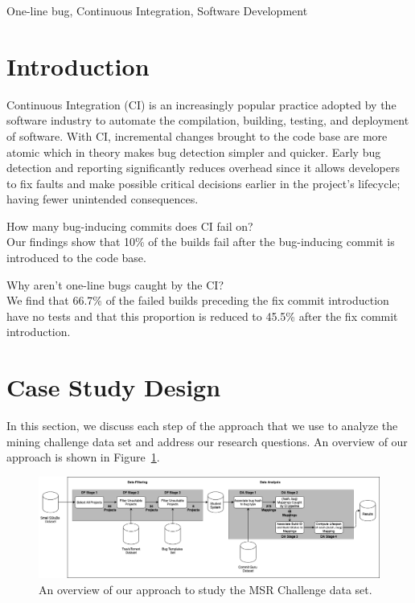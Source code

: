 \documentclass[10pt,conference]{IEEEtran}
\begin{document}
\begin{IEEEkeywords}
	One-line bug, Continuous Integration, Software Development
\end{IEEEkeywords}

\section{Introduction}
Continuous Integration (CI) is an increasingly popular practice adopted by the software industry to automate the compilation, building, testing, and deployment of software. With CI, incremental changes brought to the code base are more atomic which in theory makes bug detection simpler and quicker. Early bug detection and reporting significantly reduces overhead since it allows developers to fix faults and make possible critical decisions earlier in the project's lifecycle; having fewer unintended consequences.


\begin{questions}
    \item How many bug-inducing commits does CI fail on? \\ Our findings show that 10\% of the builds fail after the bug-inducing commit is introduced to the code base. 
\end{questions}
\begin{questions}[resume]
    \item Why aren't one-line bugs caught by the CI? \\ We find that 66.7\% of the failed builds preceding the fix commit introduction have no tests and that this proportion is reduced to 45.5\% after the fix commit introduction. 
\end{questions}

\section{Case Study Design}
In this section, we discuss each step of the approach that we use to analyze the mining challenge data set and address our research questions. An overview of our approach is shown in Figure~\ref{fig:process}.

\begin{figure}[t]
\centering
\includegraphics[width=\linewidth]{process.png}
\caption{An overview of our approach to study the MSR Challenge data set.}
\label{fig:process}
\end{figure}
\end{document}

